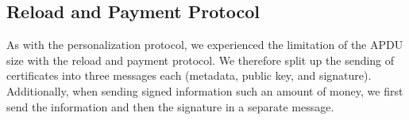 \documentclass{article}
\begin{document}
    \subsection{Reload and Payment Protocol}
    As with the personalization protocol, we experienced the limitation of the APDU size with the reload and payment protocol.
    We therefore split up the sending of certificates into three messages each (metadata, public key, and signature).
    Additionally, when sending signed information such an amount of money, we first send the information and then the signature in a separate message.
\end{document}

